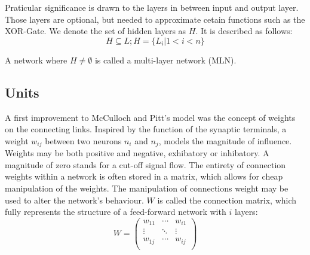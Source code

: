 \documentclass[10pt,a4paper,DIV=11]{scrreprt}
\let\oldemptyset\emptyset
\let\emptyset\varnothing
\begin{document}
\begin{figure}
\label{fig:layer}
\end{figure}

Praticular significance is drawn to the layers in between input and output layer. Those layers are optional, but needed to approximate cetain functions such as the XOR-Gate. 
We denote the set of hidden layers as $H$. It is described as follows:
\begin{equation}
H \subseteq L; H = \{L_i|1<i<n\}
\end{equation} 

A network where $H \neq \oldemptyset$ is called a multi-layer network (MLN). 

\subsection{Units}
\label{subsec:weights}

A first improvement to McCulloch and Pitt's model was the concept of weights on the connecting links. Inspired by the function of the synaptic 
terminals, a weight $w_{ij}$ between two neurons $n_i$ and $n_j$, models the magnitude of influence. Weights may be both positive and negative, 
exhibatory or inhibatory. A magnitude of zero stands for a cut-off signal flow. The entirety of connection weights within a network is often stored 
in a matrix, which allows for cheap manipulation of the weights. 
The manipulation of connections weight may be used to alter the network's behaviour. $W$ is called the connection matrix, which fully represents 
the structure of a feed-forward network with $i$ layers:
\begin{equation}
W = 
\begin{pmatrix}
w_{11} & \cdots & w_{i1} \\
\vdots & \ddots & \vdots \\
w_{1j} & \cdots & w_{ij} \\
\end{pmatrix}
\end{equation}
\end{document}

